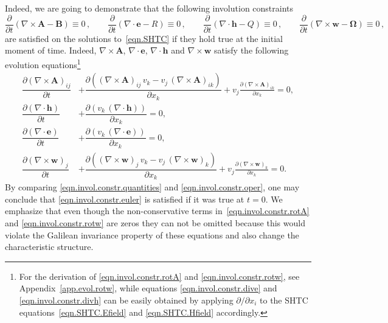 \documentclass[twoside]{article}
\newcommand{\AAA}{{\boldsymbol{A}}}
\newcommand{\ww}{{\boldsymbol{w}}}
\newcommand{\ee}{{\boldsymbol{e}}}
\newcommand{\hh}{{\boldsymbol{h}}}
\newcommand{\BB}{{\boldsymbol{B}}}
\newcommand{\pd}{\partial}
\begin{document}
Indeed, we are going to 
demonstrate that the following involution constraints
\begin{equation}\label{eqn.invol.constr.euler}
\frac{\pd }{\pd t}\left (\nabla\times\AAA - \BB\right )\equiv 0\,,\qquad 
\frac{\pd }{\pd t}\left (\nabla\cdot\ee - R\right ) \equiv 0\,, \qquad 
\frac{\pd }{\pd t}\left (\nabla \cdot \hh - Q\right ) \equiv 0\,, \qquad
\frac{\pd }{\pd t}\left ( \nabla\times\ww - \bm{\Omega}\right ) \equiv 0\,,
\end{equation}
are satisfied on the solutions to~\eqref{eqn.SHTC} if they hold true at the 
initial moment of time. Indeed, $ \nabla\times\AAA $, $ \nabla\cdot\ee $, $ 
\nabla\cdot\hh $ and $ \nabla\times\ww $ satisfy the following evolution 
equations\footnote{For the derivation of \eqref{eqn.invol.constr.rotA} and 
\eqref{eqn.invol.constr.rotw}, see Appendix~\ref{app.evol.rotw}, while 
equations 
\eqref{eqn.invol.constr.dive} and 
\eqref{eqn.invol.constr.divh} can be easily obtained by applying $ \pd/\pd x_i 
$ to the SHTC equations~\eqref{eqn.SHTC.Efield} and \eqref{eqn.SHTC.Hfield} 
accordingly.
}
\begin{subequations}\label{eqn.invol.constr.oper}
	\begin{align}
	\dfrac{\pd (\nabla\times\AAA)_{ij}}{\pd t} &+ \dfrac{\pd( 
	(\nabla\times\AAA)_{ij}\, v_k - 
	v_j\, (\nabla\times\AAA)_{ik})}{\pd x_k}  + v_j \frac{\pd 
	(\nabla\times\AAA)_{ik}}{\pd x_k} = 0, 
	\label{eqn.invol.constr.rotA}\\[2mm]
%	
	\dfrac{\pd (\nabla\cdot\hh)}{\pd t} &+ \dfrac{\pd (v_k\, 
	(\nabla\cdot\hh))}{\pd 
	x_k} = 0, 
	\label{eqn.invol.constr.divh}\\[2mm]
%	
	\dfrac{\pd (\nabla\cdot\ee)}{\pd t} &+ \dfrac{\pd (v_k\, 
	(\nabla\cdot\ee))}{\pd 
	x_k} = 0, 
	\label{eqn.invol.constr.dive}\\[2mm]
%
	\dfrac{\pd (\nabla\times\ww)_j}{\pd t} &+ \dfrac{\pd ((\nabla\times\ww)_j\, 
	v_k - v_j\, (\nabla\times\ww)_k)}{\pd x_k} + v_j \frac{\pd 
		(\nabla\times\ww)_k}{\pd x_k}= 0.
	\label{eqn.invol.constr.rotw}
	\end{align}
\end{subequations}
By comparing \eqref{eqn.invol.constr.quantities} and 
\eqref{eqn.invol.constr.oper}, one may conclude that 
\eqref{eqn.invol.constr.euler} is satisfied if it was true at $ t = 0 $. 
 We emphasize that even though the non-conservative terms 
in~\eqref{eqn.invol.constr.rotA} and \eqref{eqn.invol.constr.rotw} are zeros 
they can not be omitted because this would violate the Galilean invariance 
property of these equations and also change the characteristic structure.
\end{document}
